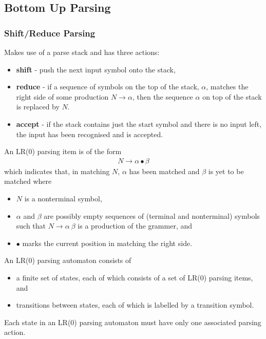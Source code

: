 \subsection{Bottom Up Parsing}

\subsubsection{Shift/Reduce Parsing}
Makes use of a parse stack and has three actions:
\begin{itemize}
    \item \textbf{shift} - push the next input symbol onto the stack,
    \item \textbf{reduce} - if a sequence of symbols on the top of the stack, $\alpha$, 
    matches the right side of some production $N \rightarrow \alpha$, then the sequence 
    $\alpha$ on top of the stack is replaced by $N$.
    \item \textbf{accept} - if the stack contains just the start symbol and there is no
    input left, the input has been recognised and is accepted.
\end{itemize}

An LR(0) parsing item is of the form
\begin{align*}
    N \rightarrow \alpha \bullet \beta
\end{align*}
which indicates that, in matching $N$, $\alpha$ has been matched and $\beta$ is yet to 
be matched where
\begin{itemize}
    \item $N$ is a nonterminal symbol,
    \item $\alpha$ and $\beta$ are possibly empty sequences of (terminal and nonterminal) 
    symbols such that $N \rightarrow \alpha\ \beta$ is a production of the grammer, and
    \item $\bullet$ marks the current position in matching the right side.
\end{itemize}

An LR(0) parsing automaton consists of
\begin{itemize}
    \item a finite set of states, each of which consists of a set of LR(0) parsing items, and
    \item transitions between states, each of which is labelled by a transition symbol.
\end{itemize}
Each state in an LR(0) parsing automaton must have only one associated parsing action.